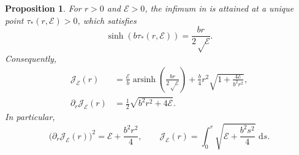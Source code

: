 \documentclass[11pt]{article}
\newtheorem{proposition}[theorem]{Proposition}
\newcommand{\dd}{\,\mathrm d}
\newcommand{\cE}{\mathcal E}
\newcommand{\cJ}{\mathcal J}
\begin{document}
\begin{proposition} \label{prop:Jminimizer}
For $r>0$ and $\cE>0$, the infimum in  is attained at a unique point $\tau_*(r,\cE)>0$, which satisfies
\begin{equation}\label{eq:radial-tau-star}
 \sinh(b\tau_*(r,\cE))=\frac{br}{2\sqrt\cE}.
\end{equation}
Consequently,
\begin{align}
 \cJ_\cE(r)
 &=\frac{\cE}{b}\operatorname{arsinh}\!\left(\frac{br}{2\sqrt\cE}\right)
 +\frac b4r^2\sqrt{1+\frac{4\cE}{b^2r^2}},\label{eq:J-explicit}\\
 \partial_r\cJ_\cE(r)
 &=\frac12\sqrt{b^2r^2+4\cE}.
 \label{eq:radial-J-prime}
\end{align}
In particular,
\begin{equation}\label{eq:J-eikonal}
 \bigl(\partial_r\cJ_\cE(r)\bigr)^2
 =\cE+\frac{b^2r^2}{4},
 \qquad
 \cJ_\cE(r)
 =\int_0^r\sqrt{\cE+\frac{b^2s^2}{4}}\,\dd s.
\end{equation}
\end{proposition}
\end{document}
